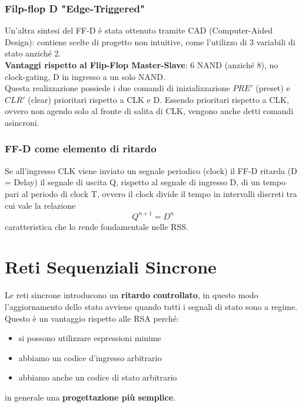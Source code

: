 \documentclass{article}
\begin{document}
\subsubsection{Filp-flop D "Edge-Triggered"}
Un’altra sintesi del FF-D è stata ottenuto tramite CAD (Computer-Aided Design): contiene scelte di progetto non intuitive, come l’utilizzo di 3 variabili di stato anziché 2.\\
\textbf{Vantaggi rispetto al Flip-Flop Master-Slave}: 6 NAND (anziché 8), no clock-gating, D in ingresso a un solo NAND.\\
Questa realizzazione possiede i due comandi di inizializzazione $PRE'$ (preset) e $CLR'$ (clear) prioritari rispetto a CLK e D. Essendo prioritari rispetto a CLK, ovvero non agendo solo al fronte di salita di CLK, vengono anche detti comandi asincroni.



\subsubsection{FF-D come elemento di ritardo}
Se all’ingresso CLK viene inviato un segnale periodico (clock) il FF-D ritarda (D = Delay) il segnale di uscita Q, rispetto al segnale di ingresso D, di un tempo pari al periodo di clock T, ovvero il clock divide il tempo in intervalli discreti tra cui vale la relazione
$$ Q^{n+1} = D^n  $$
caratteristica che lo rende fondamentale nelle RSS.




\section{Reti Sequenziali Sincrone}
Le reti sincrone introducono un \textbf{ritardo controllato}, in questo modo l’aggiornamento dello stato avviene quando tutti i segnali di stato sono a regime. Questo è un vantaggio rispetto alle RSA perché:
\begin{itemize}
    \item si possono utilizzare espressioni minime
    \item abbiamo un codice d'ingresso arbitrario
    \item abbiamo anche un codice di stato arbitrario
\end{itemize}
in generale una \textbf{progettazione più semplice}.
\end{document}
